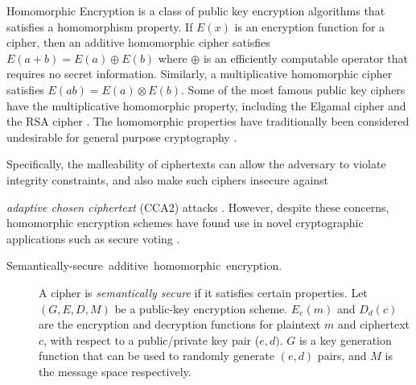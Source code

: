 Homomorphic Encryption is a class of public key encryption algorithms
that satisfies a homomorphism property.  If $E(x)$ is an encryption function
for a cipher, then an additive homomorphic cipher
satisfies $E(a+b)=E(a)\oplus E(b)$ where $\oplus$ is an efficiently
computable operator that requires no secret information.  Similarly,
a multiplicative homomorphic cipher satisfies $E(ab)=E(a)\otimes E(b)$.
Some of the most famous public key ciphers have the multiplicative
homomorphic property, including the Elgamal cipher \cite{elgamal85}
and the RSA cipher \cite{rivest83rsa}. The homomorphic properties
have traditionally been considered undesirable for general purpose
cryptography \cite{jmsw02}. %
\begin{comment}
mention Cramer-Shoup?
\end{comment}
{}Specifically, the malleability of ciphertexts can allow the adversary
to violate integrity constraints, and also make such ciphers insecure
against %
\begin{comment}
 because the homomorphic structure aids in cryptanalysis and allows
encrypted messages to be modified, violating integrity constraints.
\cite{jmsw02}. This leads to insecurity against
\end{comment}
{}\emph{adaptive chosen ciphertext} (CCA2) attacks \cite{bleichenbacher98chosen}.
However, despite these concerns, homomorphic encryption schemes have found use in novel
cryptographic applications such as secure voting \cite{benaloh94}. 
\begin{description}
\item [{Semantically-secure~additive~homomorphic~encryption.}] 
A cipher is {\it semantically secure} if it satisfies certain properties.
Let $(G,E,D,M)$ be a public-key encryption scheme.
$E_{e}(m)$ and $D_{d}(c)$ are the encryption and decryption functions
for plaintext $m$ and ciphertext $c$, with respect to a public/private
key pair ($e,d)$. $G$ is a key generation function that can be used
to randomly generate $(e,d)$ pairs, and $M$ is the message space
respectively. \end{description}
